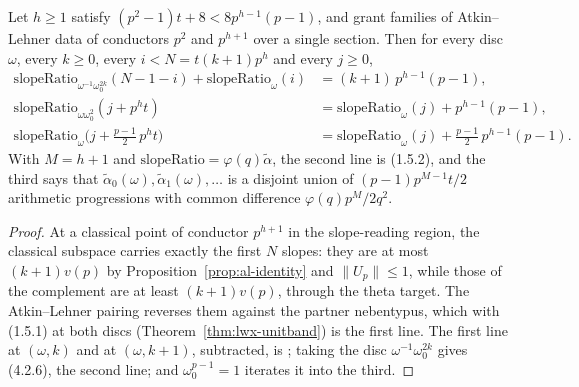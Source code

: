 \begin{theorem}
  \label{thm:lwx152}
  \leanok
  Let $h \geq 1$ satisfy $(p^{2}-1)t + 8 < 8p^{h-1}(p-1)$, and grant families of Atkin--Lehner
  data of conductors $p^{2}$ and $p^{h+1}$ over a single section.  Then for every disc $\omega$,
  every $k \geq 0$, every $i < N = t(k+1)p^{h}$ and every $j \geq 0$,
  \begin{align*}
    \mathrm{slopeRatio}_{\omega^{-1}\omega_0^{2k}}(N-1-i) + \mathrm{slopeRatio}_{\omega}(i)
      &= (k+1)\,p^{h-1}(p-1), \\
    \mathrm{slopeRatio}_{\omega\omega_0^{2}}(j + p^{h}t)
      &= \mathrm{slopeRatio}_{\omega}(j) + p^{h-1}(p-1), \\
    \mathrm{slopeRatio}_{\omega}\bigl(j + \tfrac{p-1}{2}\,p^{h}t\bigr)
      &= \mathrm{slopeRatio}_{\omega}(j) + \tfrac{p-1}{2}\,p^{h-1}(p-1).
  \end{align*}
  With $M = h+1$ and $\mathrm{slopeRatio} = \varphi(q)\tilde\alpha$, the second line is (1.5.2),
  and the third says that $\tilde\alpha_0(\omega), \tilde\alpha_1(\omega), \dots$ is a disjoint
  union of $(p-1)p^{M-1}t/2$ arithmetic progressions with common difference
  $\varphi(q)p^{M}/2q^{2}$.
\end{theorem}

\begin{proof}
  \leanok
  At a classical point of conductor $p^{h+1}$ in the slope-reading region, the classical subspace
  carries exactly the first $N$ slopes: they are at most $(k+1)v(p)$ by
  Proposition~\ref{prop:al-identity} and $\lVert U_p\rVert \leq 1$, while those of the complement
  are at least $(k+1)v(p)$, through the theta target.  The Atkin--Lehner pairing reverses them
  against the partner nebentypus, which with (1.5.1) at both discs
  (Theorem~\ref{thm:lwx-unitband}) is the first line.  The first line at $(\omega,k)$ and at
  $(\omega,k+1)$, subtracted, is \cite[(4.2.5)]{LWX}; taking the disc $\omega^{-1}\omega_0^{2k}$
  gives (4.2.6), the second line; and $\omega_0^{p-1} = 1$ iterates it into the third.
\end{proof}

